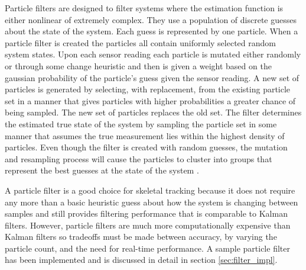 Particle filters are designed to filter systems where the estimation function is either nonlinear of extremely complex. They use a population of discrete guesses about the state of the system. Each guess is represented by one particle. When a particle filter is created the particles all contain uniformly selected random system states. Upon each sensor reading each particle is mutated either randomly or through some change heuristic and then is given a weight based on the gaussian probability of the particle’s guess given the sensor reading. A new set of particles is generated by selecting, with replacement, from the existing particle set in a manner that gives particles with higher probabilities a greater chance of being sampled. The new set of particles replaces the old set. The filter determines the estimated true state of the system by sampling the particle set in some manner that assumes the true measurement lies within the highest density of particles. Even though the filter is created with random guesses, the mutation and resampling process will cause the particles to cluster into groups that represent the best guesses at the state of the system \cite{sanjeev2002tutorial}. 

A particle filter is a good choice for skeletal tracking because it does not require any more than a basic heuristic guess about how the system is changing between samples and still provides filtering performance that is comparable to Kalman filters. However, particle filters are much more computationally expensive than Kalman filters so tradeoffs must be made between accuracy, by varying the particle count, and the need for real-time performance. A sample particle filter has been implemented and is discussed in detail in section \ref{sec:filter_impl}.